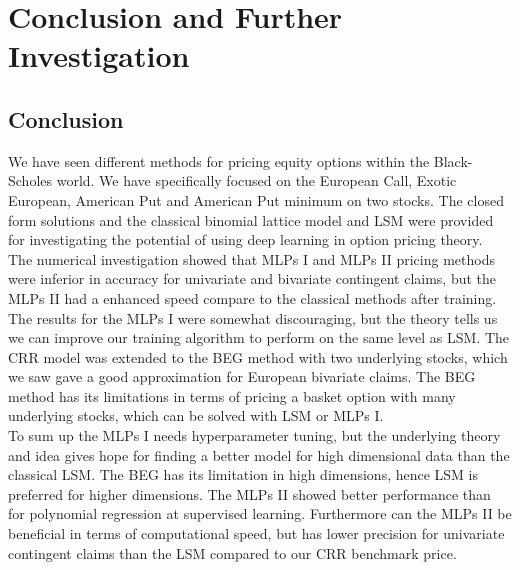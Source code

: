 
\chapter{Conclusion and Further Investigation} %

\label{Chapter7} %


\section{Conclusion}
We have seen different methods for pricing equity options within the Black-Scholes world. We have specifically focused on the European Call, Exotic European, American Put and American Put minimum on two stocks. The closed form solutions and the classical binomial lattice model and LSM were provided for investigating the potential of using deep learning in option pricing theory. \\

The numerical investigation showed that MLPs I and MLPs II pricing methods were inferior in accuracy for univariate and bivariate contingent claims, but the MLPs II had a enhanced speed compare to the classical methods after training. The results for the MLPs I were somewhat discouraging, but the theory tells us we can improve our training algorithm to perform on the same level as LSM. The CRR model was extended to the BEG method with two underlying stocks, which we saw gave a good approximation for European bivariate claims. The BEG method has its limitations in terms of pricing a basket option with many underlying stocks, which can be solved with LSM or MLPs I.\\

To sum up the MLPs I needs hyperparameter tuning, but the underlying theory and idea gives hope for finding a better model for high dimensional data than the classical LSM. The BEG has its limitation in high dimensions, hence LSM is preferred for higher dimensions. The MLPs II showed better performance than for polynomial regression at supervised learning. Furthermore can the MLPs II be beneficial in terms of computational speed, but has lower precision for univariate contingent claims than the LSM compared to our CRR benchmark price.\\


